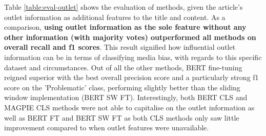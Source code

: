 Table \ref{table:eval-outlet} shows the evaluation of methods, given the article's outlet information as additional features to the title and content. As a comparison, \textbf{using outlet information as the sole feature without any other information (with majority votes) outperformed all methods on overall recall and f1 scores}. This result signified how influential outlet information can be in terms of classifying media bias, with regards to this specific dataset and circumstances. Out of all the other methods, BERT fine-tuning reigned superior with the best overall precision score and a particularly strong f1 score on the 'Problematic' class, performing slightly better than the sliding window implementation (BERT SW FT). Interestingly, both BERT CLS and MAGPIE CLS methods were not able to capitalise on the outlet information as well as BERT FT and BERT SW FT as both CLS methods only saw little improvement compared to when outlet features were unavailable.


